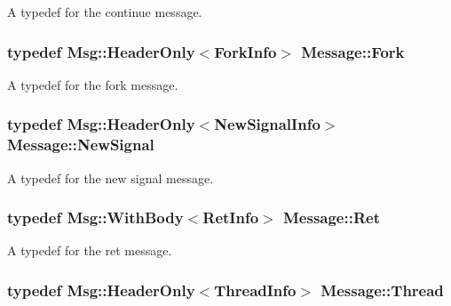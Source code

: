 A typedef for the continue message. 

\subsubsection[{\texorpdfstring{Fork}{Fork}}]{\setlength{\rightskip}{0pt plus 5cm}typedef {\bf Msg\+::\+Header\+Only}$<${\bf Fork\+Info}$>$ {\bf Message\+::\+Fork}}\hypertarget{class_message_af7272b7d937a8248ca0fe6148044e9dc}{}\label{class_message_af7272b7d937a8248ca0fe6148044e9dc}


A typedef for the fork message. 

\subsubsection[{\texorpdfstring{New\+Signal}{NewSignal}}]{\setlength{\rightskip}{0pt plus 5cm}typedef {\bf Msg\+::\+Header\+Only}$<${\bf New\+Signal\+Info}$>$ {\bf Message\+::\+New\+Signal}}\hypertarget{class_message_a1eb217095ab4b8fede7aed3c9fb0787c}{}\label{class_message_a1eb217095ab4b8fede7aed3c9fb0787c}


A typedef for the new signal message. 

\subsubsection[{\texorpdfstring{Ret}{Ret}}]{\setlength{\rightskip}{0pt plus 5cm}typedef {\bf Msg\+::\+With\+Body}$<${\bf Ret\+Info}$>$ {\bf Message\+::\+Ret}}\hypertarget{class_message_a40df5862ba4d83b310c203e0873c15eb}{}\label{class_message_a40df5862ba4d83b310c203e0873c15eb}


A typedef for the ret message. 

\subsubsection[{\texorpdfstring{Thread}{Thread}}]{\setlength{\rightskip}{0pt plus 5cm}typedef {\bf Msg\+::\+Header\+Only}$<${\bf Thread\+Info}$>$ {\bf Message\+::\+Thread}}\hypertarget{class_message_ab425362459d8d4440f14d6e02e8c6566}{}\label{class_message_ab425362459d8d4440f14d6e02e8c6566}


